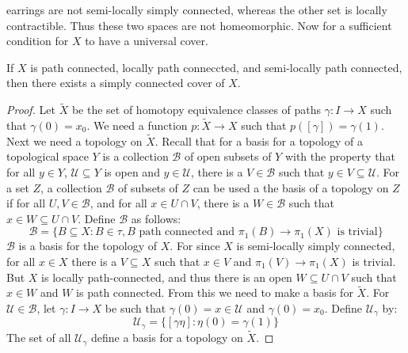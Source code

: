\documentclass{book}                                                           %
\begin{document}
            earrings are not semi-locally simply connected, whereas
            the other set is locally contractible. Thus these two
            spaces are not homeomorphic. Now for a sufficient condition
            for $X$ to have a universal cover.
            \begin{theorem}
                If $X$ is path connected, locally path conneccted,
                and semi-locally path connected, then there exists
                a simply connected cover of $X$.
            \end{theorem}
            \begin{proof}
                Let $\tilde{X}$ be the set of homotopy equivalence
                classes of paths $\gamma:I\rightarrow{X}$ such that
                $\gamma(0)=x_{0}$. We need a function
                $p:\tilde{X}\rightarrow{X}$ such that
                $p([\gamma])=\gamma(1)$. Next we need a topology
                on $\tilde{X}$. Recall that for a basis for a topology
                of a topological space $Y$ is a collection
                $\mathcal{B}$ of open subsets of $Y$ with the property
                that for all $y\in{Y}$, $\mathcal{U}\subseteq{Y}$ is
                open and $y\in\mathcal{U}$, there is a $V\in\mathcal{B}$
                such that $y\in{V}\subseteq\mathcal{U}$. For a set
                $Z$, a collection $\mathcal{B}$ of subsets of $Z$
                can be used a the basis of a topology on $Z$ if
                for all $U,V\in\mathcal{B}$, and for all
                $x\in{U}\cap{V}$, there is a $W\in\mathcal{B}$ such
                that $x\in{W}\subseteq{U}\cap{V}$. Define
                $\mathcal{B}$ as follows:
                \begin{equation}
                    \mathcal{B}=\{B\subseteq{X}:B\in\tau,
                        B\textrm{ path connected and }
                        \pi_{1}(B)\rightarrow\pi_{1}(X)
                        \textrm{ is trivial}\}
                \end{equation}
                $\mathcal{B}$ is a basis for the topology of
                $X$. For since $X$ is semi-locally simply connected,
                for all $x\in{X}$ there is a $V\subseteq{X}$ such
                that $x\in{V}$ and
                $\pi_{1}(V)\rightarrow\pi_{1}(X)$ is trivial. But
                $X$ is locally path-connected, and thus there is an
                open $W\subseteq{U}\cap{V}$ such that $x\in{W}$ and
                $W$ is path connected. From this we need to make a basis
                for $\tilde{X}$. For $\mathcal{U}\in\mathcal{B}$,
                let $\gamma:I\rightarrow{X}$ be such that
                $\gamma(0)=x\in\mathcal{U}$ and $\gamma(0)=x_{0}$.
                Define $\mathcal{U}_{\gamma}$ by:
                \begin{equation}
                    \mathcal{U}_{\gamma}=\{
                        [\gamma\eta]:\eta(0)=\gamma(1)\}
                \end{equation}
                The set of all $\mathcal{U}_{\gamma}$ define a basis
                for a topology on $\tilde{X}$.
            \end{proof}
\end{document}
